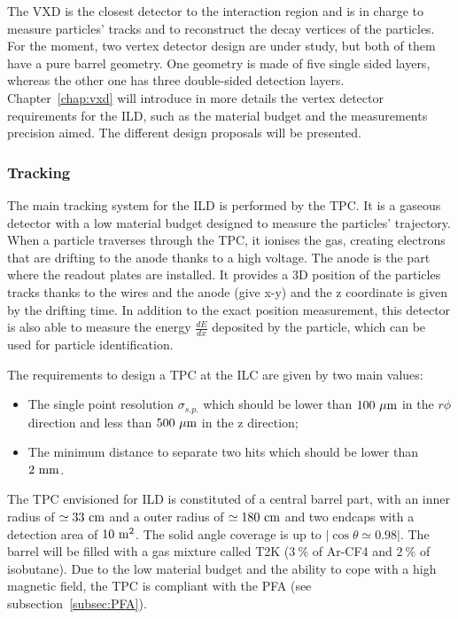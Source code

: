       The \gls{VXD} is the closest detector to the interaction region and is in charge to measure particles' tracks and to reconstruct the decay vertices of the particles.
      For the moment, two vertex detector design are under study, but both of them have a pure barrel geometry.
      One geometry is made of five single sided layers, whereas the other one has three double-sided detection layers.
      Chapter~\ref{chap:vxd} will introduce in more details the vertex detector requirements for the \gls{ILD}, such as the material budget and the measurements precision aimed.
      The different design proposals will be presented. 

      \subsubsection{Tracking}

      The main tracking system for the \gls{ILD} is performed by the \gls{TPC}.
      It is a gaseous detector with a low material budget designed to measure the particles' trajectory.
      When a particle traverses through the \gls{TPC}, it ionises the gas, creating electrons that are drifting to the anode thanks to a high voltage.
      The anode is the part where the readout plates are installed.
      It provides a 3D position of the particles tracks thanks to the wires and the anode (give x-y) and the z coordinate is given by the drifting time.
      In addition to the exact position measurement, this detector is also able to measure the energy $\frac{dE}{dx}$ deposited by the particle, which can be used for particle identification.

      The requirements to design a \gls{TPC} at the \gls{ILC} are given by two main values: 
      
      \begin{itemize} 
        \item The single point resolution $\sigma_{s.p.}$ which should be lower than $100~\rm{\mu m}$ in the $r\phi$ direction and less than $500~\rm{\mu m}$ in the z direction;
        \item The minimum distance to separate two hits which should be lower than $2~\rm{mm}$.
      \end{itemize}

      The \gls{TPC} envisioned for \gls{ILD} is constituted of a central barrel part, with an inner radius of $\simeq 33~\rm{cm}$ and a outer radius of $\simeq 180~\rm{cm}$ and two endcaps with a detection area of $10~\rm{m^2}$. 
      The solid angle coverage is up to $|\cos{\theta} \simeq 0.98|$.
      The barrel will be filled with a gas mixture called T2K ($3~\%$ of Ar-CF4 and $2~\%$ of isobutane).
      Due to the low material budget and the ability to cope with a high magnetic field, the \gls{TPC} is compliant with the \gls{PFA} (see subsection~\ref{subsec:PFA}). 


